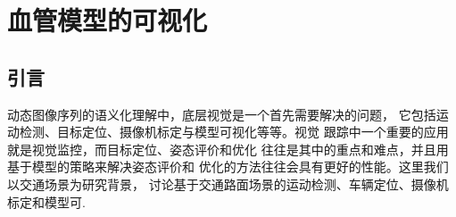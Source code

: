 \chapter{血管模型的可视化}
\label{chap4}

\section{引言}

动态图像序列的语义化理解中，底层视觉是一个首先需要解决的问题，
它包括运动检测、目标定位、摄像机标定与模型可视化等等。视觉
跟踪中一个重要的应用就是视觉监控，而目标定位、姿态评价和优化
往往是其中的重点和难点，并且用基于模型的策略来解决姿态评价和
优化的方法往往会具有更好的性能。这里我们以交通场景为研究背景，
讨论基于交通路面场景的运动检测、车辆定位、摄像机标定和模型可.
